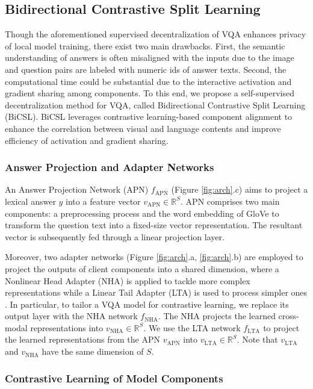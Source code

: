 \documentclass[letterpaper]{article} %
\begin{document}
\subsection{Bidirectional Contrastive Split Learning}

Though the aforementioned supervised decentralization of VQA enhances privacy of local model training, there exist two main drawbacks. First, the semantic understanding of answers is often misaligned with the inputs due to the image and question pairs are labeled with numeric ids of answer texts. Second, the computational time could be substantial due to the interactive activation and gradient sharing among components. To this end, we propose a self-supervised decentralization method for VQA, called Bidirectional Contrastive Split Learning (BiCSL). BiCSL leverages contrastive learning-based component alignment to enhance the correlation between visual and language contents and improve efficiency of activation and gradient sharing.

\subsubsection{Answer Projection and Adapter Networks}
An Answer Projection Network (APN) $f_{\text{APN}}$ (Figure \ref{fig:arch}.c) aims to project a lexical answer $y$ into a feature vector $v_{\text{APN}}\in \mathbb{R}^S$. APN comprises two main components: a preprocessing process and the word embedding of GloVe \cite{pennington2014glove} to transform the question text into a fixed-size vector representation. The resultant vector is subsequently fed through a linear projection layer.

Moreover, two adapter networks (Figure \ref{fig:arch}.a, \ref{fig:arch}.b) are employed to project the outputs of client components into a shared dimension, where a Nonlinear Head Adapter (NHA) is applied to tackle more complex representations while a Linear Tail Adapter (LTA) is used to process simpler ones \cite{mmv}. In particular, to tailor a VQA model for contrastive learning, we replace its output layer with the NHA network $f_{\text{NHA}}$. The NHA projects the learned cross-modal representations into $v_{\text{NHA}} \in \mathbb{R}^S$. We use the LTA network $f_{\text{LTA}}$ to project the learned representations from the APN $v_{\text{APN}}$ into $v_{\text{LTA}} \in \mathbb{R}^S$. Note that $v_{\text{LTA}}$ and $v_{\text{NHA}}$ have the same dimension of $S$.


\subsubsection{Contrastive Learning of Model Components}
\end{document}
